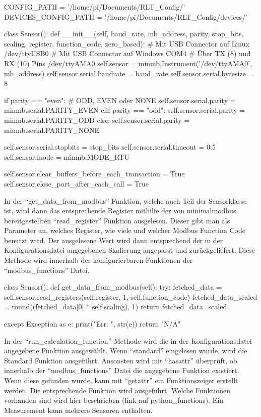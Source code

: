 \begin{pythoncode}
CONFIG_PATH = '/home/pi/Documents/RLT_Config/'
DEVICES_CONFIG_PATH = '/home/pi/Documents/RLT_Config/devices/'

class Sensor():
	def __init__(self, baud_rate, mb_address, parity, stop_bits, scaling, register, function_code, zero_based):
        # Mit USB Connector auf Linux       /dev/ttyUSB0
		# Mit USB Connector auf Windows     COM4
		# Über TX (8) und RX (10) Pins      /dev/ttyAMA0
		self.sensor = minmb.Instrument('/dev/ttyAMA0', mb_address)
		self.sensor.serial.baudrate = baud_rate
		self.sensor.serial.bytesize = 8
		
		if parity == "even":  # ODD, EVEN oder NONE
			self.sensor.serial.parity = minmb.serial.PARITY_EVEN
		elif parity == "odd":
			self.sensor.serial.parity = minmb.serial.PARITY_ODD
		else:
			self.sensor.serial.parity = minmb.serial.PARITY_NONE
		
		self.sensor.serial.stopbits = stop_bits
		self.sensor.serial.timeout = 0.5
		self.sensor.mode = minmb.MODE_RTU
		
		self.sensor.clear_buffers_before_each_transaction = True
		self.sensor.close_port_after_each_call = True
\end{pythoncode}

\label{get_data_from_modbus}
In der \enquote{get\_data\_from\_modbus} Funktion, welche auch Teil der Sensorklasse ist, wird dann das entsprechende Register mithilfe der von minimalmodbus bereitgestellten \enquote{read\_register} Funktion ausgelesen. Dieser gibt man als Parameter an, welches Register, wie viele und welcher Modbus Function Code benutzt wird. Der ausgelesene Wert wird dann entsprechend der in der Konfigurationsdatei angegebenen Skalierung angepasst und zurückgeliefert. Diese Methode wird innerhalb der konfigurierbaren Funktionen  der \enquote{modbus\_functions} Datei.

\begin{pythoncode}
class Sensor():
	def get_data_from_modbus(self):
		try:
			fetched_data = self.sensor.read_registers(self.register, 1, self.function_code)			
			fetched_data_scaled = round((fetched_data[0] * self.scaling), 1)
			return fetched_data_scaled
		
		except Exception as e:
			print("Err: ", str(e))
			return "N/A"
\end{pythoncode}

In der \enquote{run\_calculation\_function} Methode wird die in der Konfigurationsdatei angegebene Funktion ausgewählt. Wenn \enquote{standard} eingelesen wurde, wird die Standard Funktion ausgeführt. Ansonsten wird mit \enquote{hasattr} überprüft, ob innerhalb der \enquote{modbus\_functions} Datei die angegebene Funktion existiert. Wenn diese gefunden wurde, kann mit \enquote{getattr} ein Funktionszeiger erstellt werden. Die entsprechende Funktion wird ausgeführt. Welche Funktionen vorhanden sind wird hier beschrieben (link auf python\_functions). 
Ein Measurement kann mehrere Sensoren enthalten.

